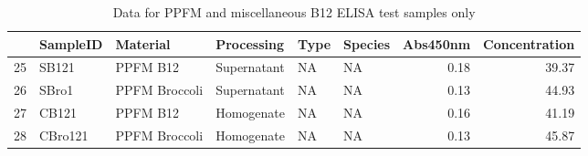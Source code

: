 \begin{table}[H]
\centering
{\small
\begin{tabular}{rlllllrr}
  \hline
 & SampleID & Material & Processing & Type & Species & Abs450nm & Concentration \\ 
  \hline
25 & SB121 & PPFM B12 & Supernatant & NA & NA & 0.18 & 39.37 \\ 
  26 & SBro1 & PPFM Broccoli & Supernatant & NA & NA & 0.13 & 44.93 \\ 
  27 & CB121 & PPFM B12 & Homogenate & NA & NA & 0.16 & 41.19 \\ 
  28 & CBro121 & PPFM Broccoli & Homogenate & NA & NA & 0.13 & 45.87 \\ 
   \hline
\end{tabular}
}
\caption{Data for PPFM and miscellaneous B12 ELISA test samples only} 
\label{tab:PPFMrevised}
\end{table}
